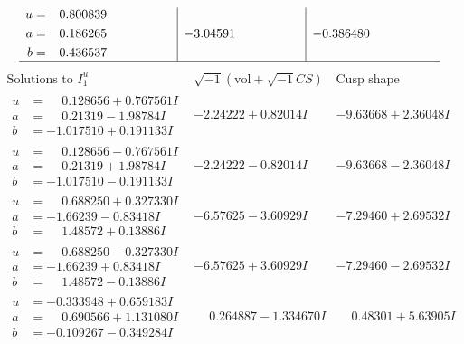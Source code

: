 \documentclass[1p]{elsarticle_modified}
\theoremstyle{definition}
\newcommand{\I}{\sqrt{-1}}
\begin{document}
$$\begin{array}{c|c|c}
\begin{aligned}
u &= \phantom{-}0.800839\phantom{ +0.000000I} \\
a &= \phantom{-}0.186265\phantom{ +0.000000I} \\
b &= \phantom{-}0.436537\phantom{ +0.000000I}\end{aligned}
 & -3.04591\phantom{ +0.000000I} & -0.386480\phantom{ +0.000000I}\\
 \hline 
 \end{array}$$\newpage$$\begin{array}{c|c|c}  
\text{Solutions to }I^u_{1}& \I (\text{vol} + \sqrt{-1}CS) & \text{Cusp shape}\\
 \hline 
\begin{aligned}
u &= \phantom{-}0.128656 + 0.767561 I \\
a &= \phantom{-}0.21319 - 1.98784 I \\
b &= -1.017510 + 0.191133 I\end{aligned}
 & -2.24222 + 0.82014 I & -9.63668 + 2.36048 I \\ \hline\begin{aligned}
u &= \phantom{-}0.128656 - 0.767561 I \\
a &= \phantom{-}0.21319 + 1.98784 I \\
b &= -1.017510 - 0.191133 I\end{aligned}
 & -2.24222 - 0.82014 I & -9.63668 - 2.36048 I \\ \hline\begin{aligned}
u &= \phantom{-}0.688250 + 0.327330 I \\
a &= -1.66239 - 0.83418 I \\
b &= \phantom{-}1.48572 + 0.13886 I\end{aligned}
 & -6.57625 - 3.60929 I & -7.29460 + 2.69532 I \\ \hline\begin{aligned}
u &= \phantom{-}0.688250 - 0.327330 I \\
a &= -1.66239 + 0.83418 I \\
b &= \phantom{-}1.48572 - 0.13886 I\end{aligned}
 & -6.57625 + 3.60929 I & -7.29460 - 2.69532 I \\ \hline\begin{aligned}
u &= -0.333948 + 0.659183 I \\
a &= \phantom{-}0.690566 + 1.131080 I \\
b &= -0.109267 - 0.349284 I\end{aligned}
 & \phantom{-}0.264887 - 1.334670 I & \phantom{-}0.48301 + 5.63905 I \\ \hline\begin{aligned}

\end{aligned}
\end{array}$$
\end{document}
